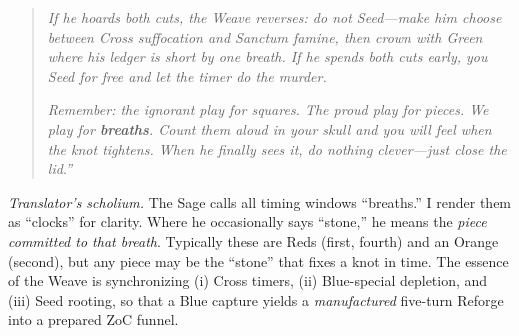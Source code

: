 \documentclass[11pt]{article}
\begin{document}
\begin{quote}
\emph{If he hoards both cuts, the Weave reverses: do not Seed---make him choose between Cross suffocation and Sanctum famine, then crown with Green where his ledger is short by one breath. If he spends both cuts early, you Seed for free and let the timer do the murder.}

\emph{Remember: the ignorant play for squares. The proud play for pieces. We play for \textbf{breaths}. Count them aloud in your skull and you will feel when the knot tightens. When he finally sees it, do nothing clever---just close the lid.''}
\end{quote}

\noindent\textit{Translator's scholium.} The Sage calls all timing windows ``breaths.'' I render them as ``clocks'' for clarity. Where he occasionally says ``stone,'' he means the \emph{piece committed to that breath}. Typically these are Reds (first, fourth) and an Orange (second), but any piece may be the ``stone'' that fixes a knot in time. The essence of the Weave is synchronizing (i) Cross timers, (ii) Blue-special depletion, and (iii) Seed rooting, so that a Blue capture yields a \emph{manufactured} five-turn Reforge into a prepared ZoC funnel.
\end{document}
